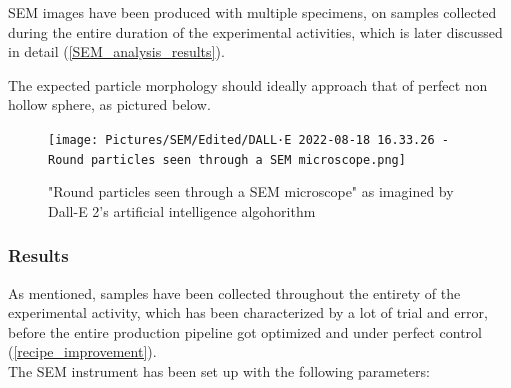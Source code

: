 \documentclass{article}
\begin{document}
        SEM images have been produced with multiple specimens, on samples collected during the entire duration of the experimental 
        activities, which is later discussed in detail (\ref{SEM_analysis_results}). 

        The expected particle morphology should ideally approach that of perfect non hollow sphere, as pictured below. 

            \begin{figure}[h!]
                \centering
                \texttt{[image: Pictures/SEM/Edited/DALL·E 2022-08-18 16.33.26 - Round particles seen through a SEM microscope.png]}
                \caption{"Round particles seen through a SEM microscope" as imagined by Dall-E 2's artificial intelligence algohorithm \autocites{DALLE2}{DALLE2_roundparticles}}
                \label{fig:SEM_DALLE2}
            \end{figure}
            \subsubsection{Results\label{SEM_analysis_results}}

            As mentioned, samples have been collected throughout the entirety of the experimental activity, which has been characterized by a lot of trial and error, before the entire production pipeline got optimized and 
            under perfect control (\ref{recipe_improvement}). \\ 

            The SEM instrument has been set up with the following parameters: 

            \begin{table}[h!]
                \centering
                \label{tab:SEM_parameters}
            \end{table}
\end{document}
